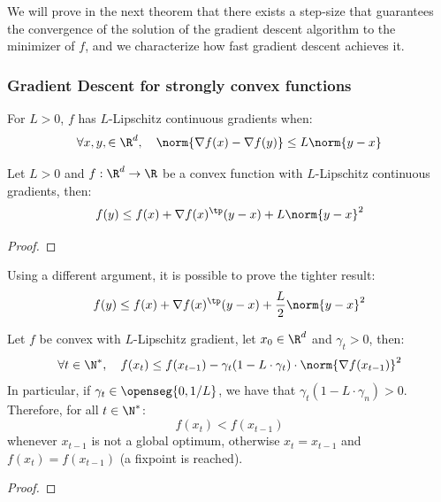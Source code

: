 \documentclass{../cs-classes/cs-classes}
\begin{document}
We will prove in the next theorem that there exists a step-size that guarantees the convergence of the solution of the gradient descent algorithm to the minimizer of $f$, and we characterize how fast gradient descent achieves it.

\subsubsection{Gradient Descent for strongly convex functions}
\begin{definition}
    For $L>0$, $f$ has $L$-Lipschitz continuous gradients when:
    \begin{equation*}
        \forall x, y, \in\R^d, \quad \norm{\nabla f(x) - \nabla f(y)}\leq L\norm{y-x}
    \end{equation*}
\end{definition}

\begin{lemma}
    Let $L>0$ and $f:\R^d\to\R$ be a convex function with $L$-Lipschitz continuous gradients, then:
    \begin{equation}
        f(y)\leq f(x)+\nabla f(x)^\tp(y-x)+L\norm{y-x}^2
    \end{equation}
\end{lemma}
\begin{proof}
\end{proof}

\begin{remark}
    Using a different argument, it is possible to prove the tighter result:
    \begin{equation}
        \label{eq:tighter-ineq}
        f(y)\leq f(x)+\nabla f(x)^\tp(y-x)+\frac{L}{2}\norm{y-x}^2
    \end{equation}
\end{remark}

\begin{lemma}
    Let $f$ be convex with $L$-Lipschitz gradient, let $x_0\in\R^d$ and $\gamma_t>0$, then:
    \begin{equation*}
        \forall t\in\N^*, \quad f(x_t)\leq f(x_{t-1}) - \gamma_t(1-L\cdot\gamma_t) \cdot \norm{\nabla f(x_{t-1})}^2
    \end{equation*}
    In particular, if $\gamma_t\in\openseg{0, 1/L}$, we have that $\gamma_t(1-L\cdot\gamma_n)>0$. Therefore, for all $t\in\N^*$:
    \begin{equation*}
        f(x_t)<f(x_{t-1})
    \end{equation*}
    whenever $x_{t-1}$ is not a global optimum, otherwise $x_t=x_{t-1}$ and $f(x_t)=f(x_{t-1})$ (a fixpoint is reached).
\end{lemma}
\begin{proof}
\end{proof}
\end{document}
